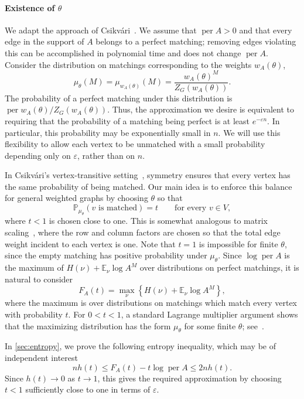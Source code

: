 \documentclass[11pt,reqno,letterpaper]{amsart}
\numberwithin{equation}{section}
\theoremstyle{definition}
\theoremstyle{remark}
\newcommand{\on}{\operatorname}
\newcommand{\E}{\mathbb E}
\newcommand{\PP}{\mathbb P}
\DeclareMathOperator{\per}{per}
\begin{document}
\medskip

\paragraph{\bf Existence of $\theta$} We adapt the approach of
Csikv\'ari~\cite{CsikvariLowerMatching,CsikvariVertexTransitive}. We assume that $\per A>0$ and that every edge in the support of $A$ belongs
to a perfect matching; removing edges violating this can be accomplished in polynomial time and does not change $\on{per}A$. Consider the distribution on matchings corresponding to the weights $w_A(\theta)$,
\[
 \mu_\theta(M) = \mu_{w_A(\theta)}(M)
 =\frac{w_A(\theta)^M}{Z_G(w_A(\theta))}.
\]
The probability of a perfect matching under this distribution
is $\per w_A(\theta)/Z_G(w_A(\theta))$. 
Thus, the approximation we desire is equivalent to requiring that the probability of a matching being perfect is at least $e^{-\varepsilon n}$. In particular, this probability may be exponentially small
in $n$. We will use this flexibility to allow each vertex
to be unmatched with a small probability depending only on
$\varepsilon$, rather than on $n$. 

In Csikv\'ari's vertex-transitive setting~\cite{CsikvariVertexTransitive}, symmetry ensures
that every vertex has the same probability of being matched. Our main idea is to enforce this balance for general weighted graphs by choosing $\theta$ so that
\begin{equation}
\label{eq:matching-prob}
 \PP_{\mu_\theta}(v\text{ is matched})=t
 \qquad\text{for every }v\in V,
\end{equation}
where $t<1$ is chosen close to one. This is somewhat analogous to
matrix scaling~\cite{LSW}, where the row and column factors
are chosen so that the total edge weight incident to each
vertex is one. Note that $t=1$ is impossible for finite $\theta$, since the
empty matching has positive probability under $\mu_\theta$.
Since $\log\per A$ is the maximum of
$H(\nu)+\E_\nu\log A^M$ over distributions on perfect matchings,
it is natural to consider
\[
 F_A(t)=\max_\nu\left\{H(\nu)+\E_\nu\log A^M\right\},
\]
where the maximum is over distributions on matchings which
match every vertex with probability $t$. For $0<t<1$, a standard Lagrange multiplier argument shows
that the maximizing distribution has the form $\mu_\theta$
for some finite $\theta$; see~\cite{SinghVishnoi}.

In \cref{sec:entropy}, we prove the following entropy inequality, which may be of independent interest
\[
 nh(t)\le F_A(t)-t\log\per A\le2nh(t).
\]
Since $h(t) \to 0$ as $t \to 1$, this gives the required approximation by choosing $t<1$
sufficiently close to one in terms of $\varepsilon$.
\end{document}
